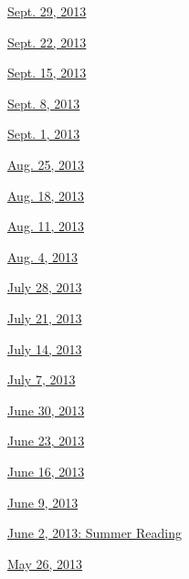 \href{http://www.nytimes3xbfgragh.onion/indexes/2013/09/29/books/review/index.html}{Sept.
29, 2013}

\href{http://www.nytimes3xbfgragh.onion/indexes/2013/09/22/books/review/index.html}{Sept.
22, 2013}

\href{http://www.nytimes3xbfgragh.onion/indexes/2013/09/15/books/review/index.html}{Sept.
15, 2013}

\href{http://www.nytimes3xbfgragh.onion/indexes/2013/09/08/books/review/index.html}{Sept.
8, 2013}

\href{http://www.nytimes3xbfgragh.onion/indexes/2013/09/01/books/review/index.html}{Sept.
1, 2013}

\href{http://www.nytimes3xbfgragh.onion/indexes/2013/08/25/books/review/index.html}{Aug.
25, 2013}

\href{http://www.nytimes3xbfgragh.onion/indexes/2013/08/18/books/review/index.html}{Aug.
18, 2013}

\href{http://www.nytimes3xbfgragh.onion/indexes/2013/08/11/books/review/index.html}{Aug.
11, 2013}

\href{http://www.nytimes3xbfgragh.onion/indexes/2013/08/04/books/review/index.html}{Aug.
4, 2013}

\href{http://www.nytimes3xbfgragh.onion/indexes/2013/07/28/books/review/index.html}{July
28, 2013}

\href{http://www.nytimes3xbfgragh.onion/indexes/2013/07/21/books/review/index.html}{July
21, 2013}

\href{http://www.nytimes3xbfgragh.onion/indexes/2013/07/14/books/review/index.html}{July
14, 2013}

\href{http://www.nytimes3xbfgragh.onion/indexes/2013/07/07/books/review/index.html}{July
7, 2013}

\href{http://www.nytimes3xbfgragh.onion/indexes/2013/06/30/books/review/index.html}{June
30, 2013}

\href{http://www.nytimes3xbfgragh.onion/indexes/2013/06/23/books/review/index.html}{June
23, 2013}

\href{http://www.nytimes3xbfgragh.onion/indexes/2013/06/16/books/review/index.html}{June
16, 2013}

\href{http://www.nytimes3xbfgragh.onion/indexes/2013/06/09/books/review/index.html}{June
9, 2013}

\href{http://www.nytimes3xbfgragh.onion/indexes/2013/06/02/books/review/index.html}{June
2, 2013: Summer Reading}

\href{http://www.nytimes3xbfgragh.onion/indexes/2013/05/26/books/review/index.html}{May
26, 2013}

